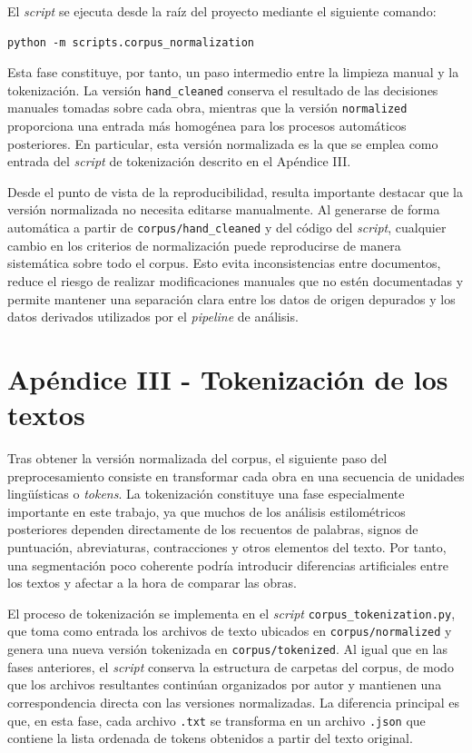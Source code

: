 \documentclass[IB]{TFUOC}%
\begin{document}
El \textit{script} se ejecuta desde la raíz del proyecto mediante el siguiente comando:

\begin{verbatim}
python -m scripts.corpus_normalization
\end{verbatim}

Esta fase constituye, por tanto, un paso intermedio entre la limpieza manual y la tokenización. La versión \texttt{hand\_cleaned} conserva el resultado de las decisiones manuales tomadas sobre cada obra, mientras que la versión \texttt{normalized} proporciona una entrada más homogénea para los procesos automáticos posteriores. En particular, esta versión normalizada es la que se emplea como entrada del \textit{script} de tokenización descrito en el Apéndice III.

Desde el punto de vista de la reproducibilidad, resulta importante destacar que la versión normalizada no necesita editarse manualmente. Al generarse de forma automática a partir de \texttt{corpus/hand\_cleaned} y del código del \textit{script}, cualquier cambio en los criterios de normalización puede reproducirse de manera sistemática sobre todo el corpus. Esto evita inconsistencias entre documentos, reduce el riesgo de realizar modificaciones manuales que no estén documentadas y permite mantener una separación clara entre los datos de origen depurados y los datos derivados utilizados por el \textit{pipeline} de análisis.

\section*{Apéndice III - Tokenización de los textos}
\label{apx:tokenizacion}

Tras obtener la versión normalizada del corpus, el siguiente paso del preprocesamiento consiste en transformar cada obra en una secuencia de unidades lingüísticas o \textit{tokens}. La tokenización constituye una fase especialmente importante en este trabajo, ya que muchos de los análisis estilométricos posteriores dependen directamente de los recuentos de palabras, signos de puntuación, abreviaturas, contracciones y otros elementos del texto. Por tanto, una segmentación poco coherente podría introducir diferencias artificiales entre los textos y afectar a la hora de comparar las obras.

El proceso de tokenización se implementa en el \textit{script} \texttt{corpus\_tokenization.py}, que toma como entrada los archivos de texto ubicados en \texttt{corpus/normalized} y genera una nueva versión tokenizada en \texttt{corpus/tokenized}. Al igual que en las fases anteriores, el \textit{script} conserva la estructura de carpetas del corpus, de modo que los archivos resultantes continúan organizados por autor y mantienen una correspondencia directa con las versiones normalizadas. La diferencia principal es que, en esta fase, cada archivo \texttt{.txt} se transforma en un archivo \texttt{.json} que contiene la lista ordenada de tokens obtenidos a partir del texto original.
\end{document}
